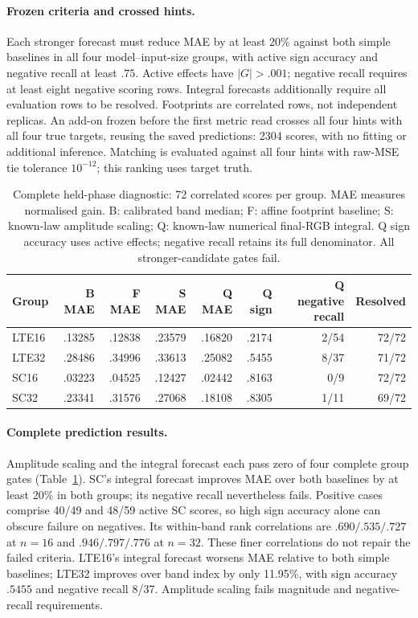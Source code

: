\paragraph{Frozen criteria and crossed hints.}
Each stronger forecast must reduce MAE by at least 20\% against both simple baselines in all four model--input-size groups, with active sign accuracy and negative recall at least $.75$. Active effects have $|G|>.001$; negative recall requires at least eight negative scoring rows. Integral forecasts additionally require all evaluation rows to be resolved. Footprints are correlated rows, not independent replicas. An add-on frozen before the first metric read crosses all four hints with all four true targets, reusing the saved predictions: 2304 scores, with no fitting or additional inference. Matching is evaluated against all four hints with raw-MSE tie tolerance $10^{-12}$; this ranking uses target truth.

\begin{table}[t]\centering\small
\caption{Complete held-phase diagnostic: 72 correlated scores per group. MAE measures normalised gain. B: calibrated band median; F: affine footprint baseline; S: known-law amplitude scaling; Q: known-law numerical final-RGB integral. Q sign accuracy uses active effects; negative recall retains its full denominator. All stronger-candidate gates fail.}\label{tab:probe-prediction}
\begin{tabular}{lrrrrrrr}\toprule
Group & B MAE & F MAE & S MAE & Q MAE & Q sign & Q negative recall & Resolved\\\midrule
LTE16 & .13285 & .12838 & .23579 & .16820 & .2174 & 2/54 & 72/72\\
LTE32 & .28486 & .34996 & .33613 & .25082 & .5455 & 8/37 & 71/72\\
SC16 & .03223 & .04525 & .12427 & .02442 & .8163 & 0/9 & 72/72\\
SC32 & .23341 & .31576 & .27068 & .18108 & .8305 & 1/11 & 69/72\\\bottomrule
\end{tabular}
\end{table}

\paragraph{Complete prediction results.}
Amplitude scaling and the integral forecast each pass zero of four complete group gates (Table~\ref{tab:probe-prediction}). SC's integral forecast improves MAE over both baselines by at least 20\% in both groups; its negative recall nevertheless fails. Positive cases comprise 40/49 and 48/59 active SC scores, so high sign accuracy alone can obscure failure on negatives. Its within-band rank correlations are $.690/.535/.727$ at $n=16$ and $.946/.797/.776$ at $n=32$. These finer correlations do not repair the failed criteria. LTE16's integral forecast worsens MAE relative to both simple baselines; LTE32 improves over band index by only 11.95\%, with sign accuracy $.5455$ and negative recall 8/37. Amplitude scaling fails magnitude and negative-recall requirements.


